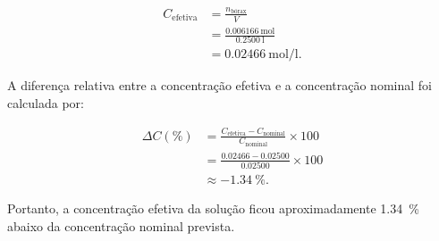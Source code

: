 \documentclass[a4paper,12pt]{article}
\begin{document}
\begin{align*}
  C_{\text{efetiva}}
    &= \frac{n_{\text{bórax}}}{V} \\
    &= \frac{\qty{0.006166}{\mole}}
             {\qty{0.2500}{\litre}} \\
    &= \boxed{\qty{0.02466}{\mole\per\litre}}.
\end{align*}

A diferença relativa entre a concentração efetiva e a concentração nominal foi calculada por:

\begin{align*}
  \Delta C(\%)
    &= \frac{C_{\text{efetiva}}-C_{\text{nominal}}}
             {C_{\text{nominal}}}\times 100 \\
    &= \frac{0.02466-0.02500}{0.02500}\times 100 \\
    &\approx \boxed{-\qty{1.34}{\percent}}.
\end{align*}

Portanto, a concentração efetiva da solução ficou aproximadamente \qty{1.34}{\percent} abaixo da concentração nominal prevista.
\end{document}
